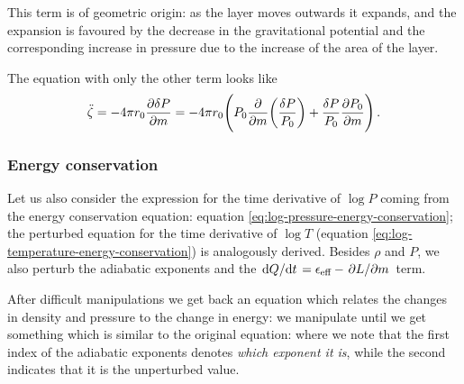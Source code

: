\documentclass[main.tex]{subfiles}
\begin{document}
This term is of geometric origin: as the layer moves outwards it expands, and the expansion is favoured by the decrease in the gravitational potential and the corresponding increase in pressure due to the increase of the area of the layer. 

The equation with only the other term looks like 
%
\begin{align}
\ddot{\zeta} = - 4 \pi r_0 \pdv{ \delta P }{m}
= - 4 \pi r_0  \qty( P_0 \pdv{}{m} \qty(\frac{ \delta P }{P_0 }) + \frac{ \delta P}{P_0 } \pdv{P_0 }{m})
\,.
\end{align}


\subsubsection{Energy conservation}

Let us also consider the expression for the time derivative of \(\log P\) coming from the energy conservation equation: equation \eqref{eq:log-pressure-energy-conservation}; the perturbed equation for the time derivative of \(\log T\) (equation \eqref{eq:log-temperature-energy-conservation}) is analogously derived.  
Besides \(\rho \) and \(P\), we also perturb the adiabatic exponents and the \(\dv*{Q}{t} = \epsilon_{\text{eff}} - \pdv*{L}{m}\) term.

After difficult manipulations we get back an equation which relates the changes in density and pressure to the change in energy: we manipulate until we get something which is similar to the original equation: 
%
%
where we note that the first index of the adiabatic exponents denotes \emph{which exponent it is}, while the second indicates that it is the unperturbed value.
\end{document}
